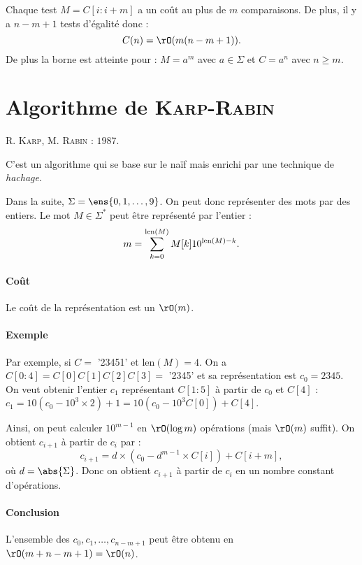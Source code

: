 \documentclass{mybourbaki}
\begin{document}
Chaque test $M = C[i:i+m]$ a un coût au plus de $m$ comparaisons. De plus, il y a $n-m+1$ tests d'égalité donc : \[ C(n) = \rO(m(n-m+1)).\]
De plus la borne est atteinte pour : $M = a^{m}$ avec $a\in \Sigma$ et $C = a^{n}$ avec $n\geq m$.

\section{Algorithme de \textsc{Karp}-\textsc{Rabin}}
R. \textsc{Karp}, M. \textsc{Rabin} : $1987$.

C'est un algorithme qui se base sur le naïf mais enrichi par une technique de \textit{hachage}.

Dans la suite, $\Sigma = \ens{0,1,\ldots,9}$. On peut donc  représenter des mots par des entiers. Le mot $M \in \Sigma^{*}$ peut être représenté par l'entier : \[ m = \sum_{k=0}^{{\rm len}(M)}M[k]10^{{\rm len}(M) - k}.\]

\paragraph{Coût}Le coût de la représentation est un $\rO(m)$.
\paragraph{Exemple}
Par exemple, si $C =$ '23451' et len$(M)=4$. On a $C[0:4] = C[0]C[1]C[2]C[3] =$ '2345' et sa représentation est $c_0 = 2345$. On veut obtenir l'entier $c_1$ représentant $C[1:5]$ à partir de $c_0$ et $C[4]$ : $c_1 = 10(c_0 - 10^{3}\times 2) +1 = 10(c_0 - 10^{3}C[0]) + C[4]$.

Ainsi, on peut calculer $10^{m-1}$ en $\rO(\log m)$ opérations (mais $\rO(m)$ suffit). On obtient $c_{i+1}$ à partir de $c_i$ par : \[c_{i+1} = d\times(c_0 - d^{m-1}\times C[i]) + C[i+m], \]où $d=\abs{\Sigma}$.
Donc on obtient $c_{i+1}$ à partir de $c_i$ en un nombre constant d'opérations.

\paragraph{Conclusion}L'ensemble des $c_0,c_1,\ldots,c_{n-m+1}$ peut être obtenu en $\rO(m+n-m+1) = \rO(n)$.
\end{document}
